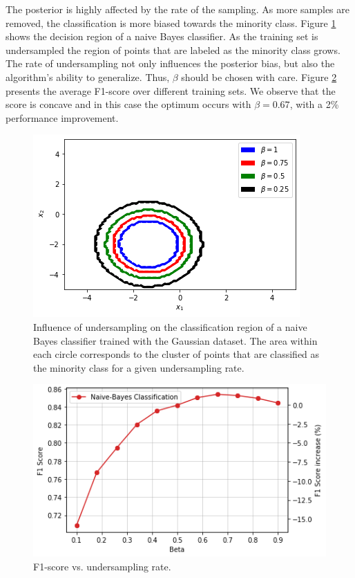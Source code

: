 \documentclass[conference]{IEEEtran}
\begin{document}
		The posterior is highly affected by the rate of the sampling. As more samples are removed, the classification is more biased towards the minority class. Figure \ref{fig:Undersampling_2D_Contour_Classification} shows the decision region of a naive Bayes classifier. As the training set is undersampled the region of points that are labeled as the minority class grows. The rate of undersampling not only influences the posterior bias, but also the algorithm's ability to generalize. Thus, $\beta$ should be chosen with care. Figure \ref{fig:Undersampling_F1_Score} presents the average F1-score over different training sets. We observe that the score is concave and in this case the optimum occurs with $\beta=0.67$, with a 2\% performance improvement.

			\begin{figure}[h]
				\includegraphics[scale=0.45]{Undersampling_2D_Contour_Classification}
				\centering
				\caption{Influence of undersampling on the classification region of a naive Bayes classifier trained with the Gaussian dataset. The area within each circle corresponds to the cluster of points that are classified as the minority class for a given undersampling rate.}
				\label{fig:Undersampling_2D_Contour_Classification}
			\end{figure}
		
			\begin{figure}[h]
				\includegraphics[scale=0.45]{Undersampling_F1_Score}
				\centering
				\caption{F1-score vs. undersampling rate.}
				\label{fig:Undersampling_F1_Score}
			\end{figure}
		
\end{document}
